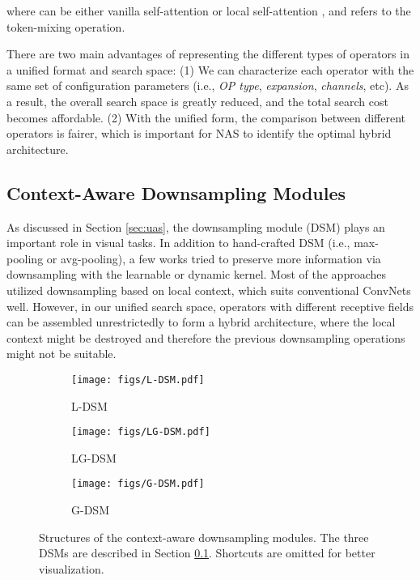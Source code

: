 \documentclass[runningheads]{llncs}
\begin{document}
where  can be either vanilla self-attention or local self-attention , and  refers to the token-mixing operation.

There are two main advantages of representing the different types of operators in a unified format and search space: (1) We can characterize each operator with the same set of configuration parameters (i.e., \textit{OP type}, \textit{expansion}, \textit{channels}, etc). As a result, the overall search space is greatly reduced, and the total search cost becomes affordable. (2) With the unified form, the comparison between different operators is fairer, which is important for NAS \cite{mnas} to identify the optimal hybrid architecture.



\subsection{Context-Aware Downsampling Modules}
\label{sec:dsm}

As discussed in Section \ref{sec:uas}, the downsampling module (DSM) plays an important role in visual tasks. In addition to hand-crafted DSM (i.e., max-pooling or avg-pooling), a few works \cite{dpp,lip,carafe++} tried to preserve more information via downsampling with the learnable or dynamic kernel. Most of the approaches utilized downsampling based on local context, which suits conventional ConvNets well. However, in our unified search space, operators with different receptive fields can be assembled unrestrictedly to form a hybrid architecture, where the local context might be destroyed and therefore the previous downsampling operations might not be suitable. 


\begin{figure}[t]
    \centering
     \begin{subfigure}[b]{0.17\linewidth}
         \centering
         \texttt{[image: figs/L-DSM.pdf]}
         \caption{L-DSM}
         \label{fig:ldsm}
     \end{subfigure}
     \hspace{1.5em} 
     \begin{subfigure}[b]{0.17\linewidth}
         \centering
         \texttt{[image: figs/LG-DSM.pdf]}
         \caption{LG-DSM}
         \label{fig:lgdsm}
     \end{subfigure}
     \hspace{1.5em} 
     \begin{subfigure}[b]{0.17\linewidth}
         \centering
         \texttt{[image: figs/G-DSM.pdf]}
         \caption{G-DSM}
         \label{fig:gdsm}
     \end{subfigure}
\caption{Structures of the context-aware downsampling modules. The three DSMs are described in Section \ref{sec:dsm}. Shortcuts are omitted for better visualization.}
    \label{fig:dsms}
\end{figure}
\end{document}
